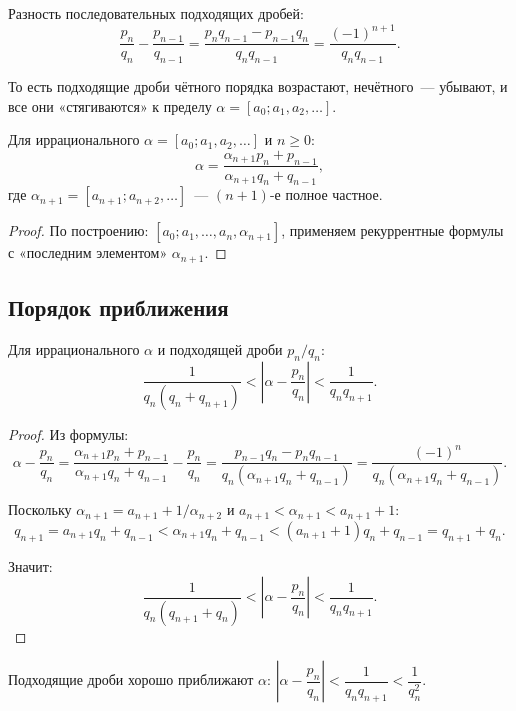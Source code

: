 \documentclass[12pt]{article}
\begin{document}
	\begin{corollary}
		Разность последовательных подходящих дробей:
		\[\frac{p_n}{q_n} - \frac{p_{n-1}}{q_{n-1}} = \frac{p_n q_{n-1} - p_{n-1} q_n}{q_n q_{n-1}} = \frac{(-1)^{n+1}}{q_n q_{n-1}}.\]
		
		То есть подходящие дроби чётного порядка возрастают, нечётного~--- убывают, и все они «стягиваются» к пределу $\alpha = [a_0; a_1, a_2, \dots]$.
	\end{corollary}
	
	\begin{theorem}
		Для иррационального $\alpha = [a_0; a_1, a_2, \dots]$ и $n \geqslant 0$:
		\[\alpha = \frac{\alpha_{n+1} p_n + p_{n-1}}{\alpha_{n+1} q_n + q_{n-1}},\]
		где $\alpha_{n+1} = [a_{n+1}; a_{n+2}, \dots]$~--- $(n+1)$-е полное частное.
	\end{theorem}
	
	\begin{proof}
		По построению: $[a_0; a_1, \dots, a_n, \alpha_{n+1}]$, применяем рекуррентные формулы с «последним элементом» $\alpha_{n+1}$.
	\end{proof}
	
	\subsection{Порядок приближения}
	
	\begin{theorem}
		Для иррационального $\alpha$ и подходящей дроби $p_n/q_n$:
		\[\frac{1}{q_n(q_n + q_{n+1})} < \left|\alpha - \frac{p_n}{q_n}\right| < \frac{1}{q_n q_{n+1}}.\]
	\end{theorem}
	
	\begin{proof}
		Из формулы:
		\[\alpha - \frac{p_n}{q_n} = \frac{\alpha_{n+1} p_n + p_{n-1}}{\alpha_{n+1} q_n + q_{n-1}} - \frac{p_n}{q_n} = \frac{p_{n-1} q_n - p_n q_{n-1}}{q_n(\alpha_{n+1} q_n + q_{n-1})} = \frac{(-1)^n}{q_n(\alpha_{n+1} q_n + q_{n-1})}.\]
		
		Поскольку $\alpha_{n+1} = a_{n+1} + 1/\alpha_{n+2}$ и $a_{n+1} < \alpha_{n+1} < a_{n+1} + 1$:
		\[q_{n+1} = a_{n+1} q_n + q_{n-1} < \alpha_{n+1} q_n + q_{n-1} < (a_{n+1}+1) q_n + q_{n-1} = q_{n+1} + q_n.\]
		
		Значит:
		\[\frac{1}{q_n(q_{n+1} + q_n)} < \left|\alpha - \frac{p_n}{q_n}\right| < \frac{1}{q_n q_{n+1}}.\]
	\end{proof}
	
	\begin{corollary}
		Подходящие дроби хорошо приближают $\alpha$: $\left|\alpha - \dfrac{p_n}{q_n}\right| < \dfrac{1}{q_n q_{n+1}} < \dfrac{1}{q_n^2}$.
	\end{corollary}
	
\end{document}
